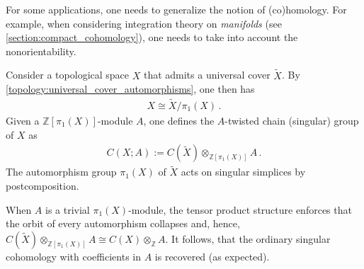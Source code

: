     For some applications, one needs to generalize the notion of (co)homology. For example, when considering integration theory on \textit{manifolds} (see \cref{section:compact_cohomology}), one needs to take into account the nonorientability.

    Consider a topological space $X$ that admits a universal cover $\widetilde{X}$. By \cref{topology:universal_cover_automorphisms}, one then has
    \begin{gather}
        X\cong\widetilde{X}/\pi_1(X)\,.
    \end{gather}
    Given a $\mathbb{Z}[\pi_1(X)]$-module $A$, one defines the $A$-twisted chain (singular) group of $X$ as
    \begin{gather}
        C(X;A):=C(\widetilde{X})\otimes_{\mathbb{Z}[\pi_1(X)]}A\,.
    \end{gather}
    The automorphism group $\pi_1(X)$ of $\widetilde{X}$ acts on singular simplices by postcomposition.

    When $A$ is a trivial $\pi_1(X)$-module, the tensor product structure enforces that the orbit of every automorphism collapses and, hence, $C(\widetilde{X})\otimes_{\mathbb{Z}[\pi_1(X)]}A\cong C(X)\otimes_{\mathbb{Z}}A$. It follows, that the ordinary singular cohomology with coefficients in $A$ is recovered (as expected).


\section{}\label{section:eilenberg_steenrod}

